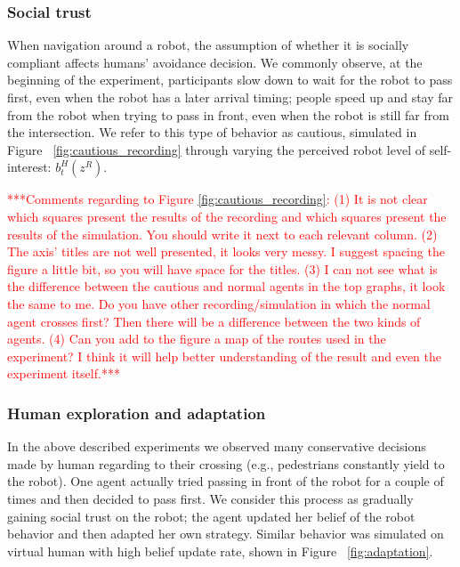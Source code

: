 \documentclass[letterpaper, 10 pt, conference]{ieeeconf}  %
\begin{document}
\subsubsection{Social trust}
When navigation around a robot, the assumption of whether it is socially compliant affects humans' avoidance decision. We commonly observe, at the beginning of the experiment, participants slow down to wait for the robot to pass first, even when the robot has a later arrival timing; people speed up and stay far from the robot when trying to pass in front, even when the robot is still far from the intersection. 
We refer to this type of behavior as cautious, simulated in Figure ~\ref{fig:cautious_recording} through 
varying the perceived robot level of self-interest: $b^H_t(z^R)$. 

\textcolor{red}{***Comments regarding to Figure \ref{fig:cautious_recording}: (1) It is not clear which squares present the results of the recording and which squares  present the results of the simulation. You should write it next to each relevant column. (2) The axis' titles are not well presented, it looks very messy. I suggest spacing the figure a little bit, so you will have space for the titles. (3) I can not see what is the difference between the cautious and normal agents in the top graphs, it look the same to me. Do you have other recording/simulation in which the normal agent crosses first? Then there will be a difference between the two kinds of agents. (4) Can you add to the figure a map of the routes used in the experiment? I think it will help better understanding of the result and even the experiment itself.*** }

\subsubsection{Human exploration and adaptation}
In the above described experiments we observed many conservative decisions made by human regarding to their crossing (e.g., pedestrians constantly yield to the robot). One agent actually tried passing in front of the robot for a couple of times and then decided to pass first. We consider this process as gradually gaining social trust on the robot; the agent updated her belief of the robot behavior and then adapted her own strategy. Similar behavior was simulated on virtual human with high belief update rate, shown in Figure ~\ref{fig:adaptation}.   
\end{document}

